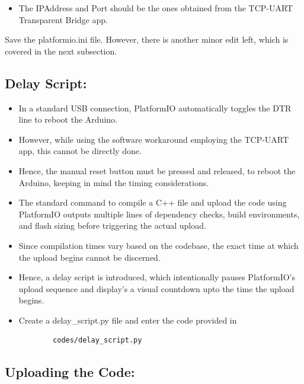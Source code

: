 \documentclass[conference]{IEEEtran} %
\begin{document}
\begin{itemize}
    \item The IPAddress and Port should be the ones obtained from the TCP-UART Transparent Bridge app. 
\end{itemize}

Save the platformio.ini file. However, there is another minor edit left, which is covered in the next subsection.

\subsection{Delay Script:}

\begin{itemize}
    \item In a standard USB connection, PlatformIO automatically toggles the DTR  line to reboot the Arduino. 
    \item However, while using the software workaround employing the TCP-UART app, this cannot be directly done.  
    \item Hence, the manual reset button must be pressed and released, to reboot the Arduino, keeping in mind the timing considerations. 
    \item The standard command to compile a C++ file and upload the code using PlatformIO outputs multiple lines of dependency checks, build environments, and flash sizing before triggering the actual upload.
    \item Since compilation times vary based on the codebase, the exact time at which the upload begins cannot be discerned. 
 
    \item Hence, a delay script is introduced, which intentionally pauses PlatformIO's upload sequence and display's a visual countdown upto the time the upload begins. 
    \item Create a delay\_script.py file and enter the code provided in 
	    \begin{lstlisting}
	    codes/delay_script.py
	    \end{lstlisting}
\end{itemize}

\subsection{Uploading the Code:}
\end{document}
